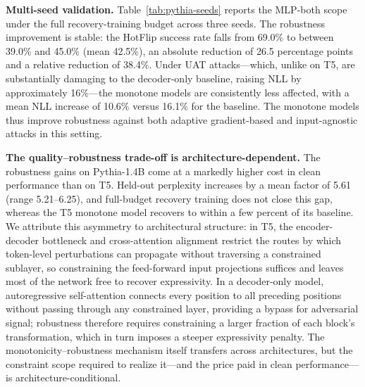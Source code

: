 \documentclass{article}
\theoremstyle{plain}
\theoremstyle{definition}
\theoremstyle{remark}
\begin{document}
\textbf{Multi-seed validation.}
Table~\ref{tab:pythia-seeds} reports the MLP-both scope under the full recovery-training budget across three seeds. The robustness improvement is stable: the HotFlip success rate falls from 69.0\% to between 39.0\% and 45.0\% (mean 42.5\%), an absolute reduction of 26.5 percentage points and a relative reduction of 38.4\%. Under UAT attacks—which, unlike on T5, are substantially damaging to the decoder-only baseline, raising NLL by approximately 16\%—the monotone models are consistently less affected, with a mean NLL increase of 10.6\% versus 16.1\% for the baseline. The monotone models thus improve robustness against both adaptive gradient-based and input-agnostic attacks in this setting.

\begin{table}[t]
\caption{Pythia-1.4B results with the MLP-both constraint scope under the full recovery budget. PPL denotes held-out Pile perplexity; SR denotes HotFlip attack success rate ($n = 200$, 10 flips); UAT NLL$\uparrow$ denotes the relative NLL increase under the learned universal trigger (base $\to$ monotone).}
\label{tab:pythia-seeds}
\vskip 0.1in
\centering
{}
\vskip -0.1in
\end{table}

\textbf{The quality--robustness trade-off is architecture-dependent.}
The robustness gains on Pythia-1.4B come at a markedly higher cost in clean performance than on T5. Held-out perplexity increases by a mean factor of 5.61 (range 5.21--6.25), and full-budget recovery training does not close this gap, whereas the T5 monotone model recovers to within a few percent of its baseline. We attribute this asymmetry to architectural structure: in T5, the encoder-decoder bottleneck and cross-attention alignment restrict the routes by which token-level perturbations can propagate without traversing a constrained sublayer, so constraining the feed-forward input projections suffices and leaves most of the network free to recover expressivity. In a decoder-only model, autoregressive self-attention connects every position to all preceding positions without passing through any constrained layer, providing a bypass for adversarial signal; robustness therefore requires constraining a larger fraction of each block's transformation, which in turn imposes a steeper expressivity penalty. The monotonicity--robustness mechanism itself transfers across architectures, but the constraint scope required to realize it—and the price paid in clean performance—is architecture-conditional.
\end{document}
